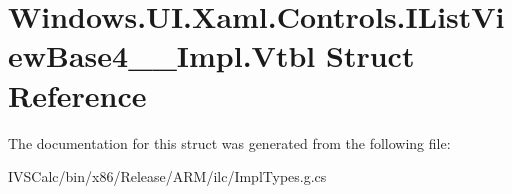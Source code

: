 \hypertarget{struct_windows_1_1_u_i_1_1_xaml_1_1_controls_1_1_i_list_view_base4_____impl_1_1_vtbl}{}\section{Windows.\+U\+I.\+Xaml.\+Controls.\+I\+List\+View\+Base4\+\_\+\+\_\+\+Impl.\+Vtbl Struct Reference}
\label{struct_windows_1_1_u_i_1_1_xaml_1_1_controls_1_1_i_list_view_base4_____impl_1_1_vtbl}


The documentation for this struct was generated from the following file\+:\begin{DoxyCompactItemize}
\item 
I\+V\+S\+Calc/bin/x86/\+Release/\+A\+R\+M/ilc/Impl\+Types.\+g.\+cs\end{DoxyCompactItemize}

